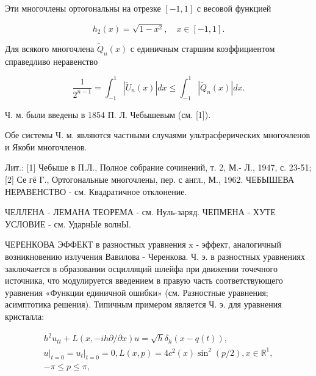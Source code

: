\documentclass[10pt]{article}
\begin{document}
Эти многочлены ортогональны на отрезке $[-1,1]$ с весовой функцией



\[

h_{2}(x)=\sqrt{1-x^{2}}, \quad x \in[-1,1] .

\]



Для всякого многочлена $\widetilde{Q}_{n}(x)$ с единичным старшим коэффициентом справедливо неравенство



\[

\frac{1}{2^{n-1}}=\int_{-1}^{1}\left|\tilde{U}_{n}(x)\right| d x \leqslant \int_{-1}^{1}\left|\tilde{Q}_{n}(x)\right| d x .

\]



Ч. м. были введены в 1854 П. Л. Чебышевым (см. [1]).



Обе системы Ч. м. являются частными случаями ультрасферических многочленов и Якоби многочленов.



Лит.: [1] Чебыше в П.Л., Полное собрание сочинений, т. 2, М.- Л., 1947, с. 23-51; [2] Се гё Г., Ортогональные многочлены, пер. с англ., М., 1962. ЧЕБЫШЕВА НЕРАВЕНСТВО - см. Квадратичное отклонение.



ЧЕЛЛЕНА - ЛЕМАНА ТЕОРЕМА - см. Нуль-заряд. ЧЕПМЕНА - ХУТЕ УСЛОВИЕ - см. УдарнЫе волнЫ.



ЧЕРЕНКОВА ЭФФЕКТ в разностных уравнения $\mathrm{x}$ - эффект, аналогичный возникновению излучения Вавилова - Черенкова. Ч. э. в разностных уравнениях заключается в образовании осцилляций шлейфа при движении точечного источника, что модулируется введением в правую часть соответствующего уравнения «Функции единичной ошибки» (см. Разностные уравнения; асимптотика решения). Типичным примером является Ч. э. для уравнения кристалла:



\[

\begin{gathered}

h^{2} u_{t t}+L(x,-i h \partial / \partial x) u=\sqrt{h} \delta_{h}(x-q(t)), \\

\left.u\right|_{t=0}=\left.u_{t}\right|_{t=0}=0, L(x, p)=4 c^{2}(x) \sin ^{2}(p / 2), x \in \mathbb{R}^{1}, \\

-\pi \leqslant p \leqslant \pi,

\end{gathered}

\]
\end{document}
